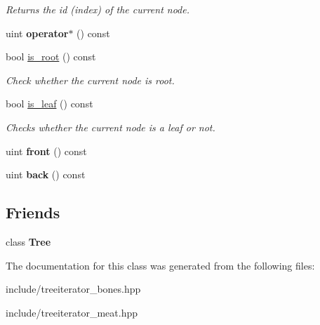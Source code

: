 \begin{DoxyCompactItemize}
\begin{DoxyCompactList}\small\item\em Returns the id (index) of the current node. \end{DoxyCompactList}\item 
uint {\bfseries operator$\ast$} () const \hypertarget{classTreeIterator_a94819be0c93c76f72cf34b584d7add79}{}\label{classTreeIterator_a94819be0c93c76f72cf34b584d7add79}

\item 
bool \hyperlink{classTreeIterator_a641055ff6b66b09cc6b4826e3b826b28}{is\+\_\+root} () const \hypertarget{classTreeIterator_a641055ff6b66b09cc6b4826e3b826b28}{}\label{classTreeIterator_a641055ff6b66b09cc6b4826e3b826b28}

\begin{DoxyCompactList}\small\item\em Check whether the current node is root. \end{DoxyCompactList}\item 
bool \hyperlink{classTreeIterator_a42538b1bf741b30d6bda489f1944d033}{is\+\_\+leaf} () const \hypertarget{classTreeIterator_a42538b1bf741b30d6bda489f1944d033}{}\label{classTreeIterator_a42538b1bf741b30d6bda489f1944d033}

\begin{DoxyCompactList}\small\item\em Checks whether the current node is a leaf or not. \end{DoxyCompactList}\item 
uint {\bfseries front} () const \hypertarget{classTreeIterator_ae2db13b649fed318efb85eb84209c9d1}{}\label{classTreeIterator_ae2db13b649fed318efb85eb84209c9d1}

\item 
uint {\bfseries back} () const \hypertarget{classTreeIterator_a6916561fe4515aa88b4af8344b16c1fd}{}\label{classTreeIterator_a6916561fe4515aa88b4af8344b16c1fd}

\end{DoxyCompactItemize}
\subsection*{Friends}
\begin{DoxyCompactItemize}
\item 
class {\bfseries Tree}\hypertarget{classTreeIterator_a4b682814d14447120dd184fd300deade}{}\label{classTreeIterator_a4b682814d14447120dd184fd300deade}

\end{DoxyCompactItemize}


The documentation for this class was generated from the following files\+:\begin{DoxyCompactItemize}
\item 
include/treeiterator\+\_\+bones.\+hpp\item 
include/treeiterator\+\_\+meat.\+hpp\end{DoxyCompactItemize}

